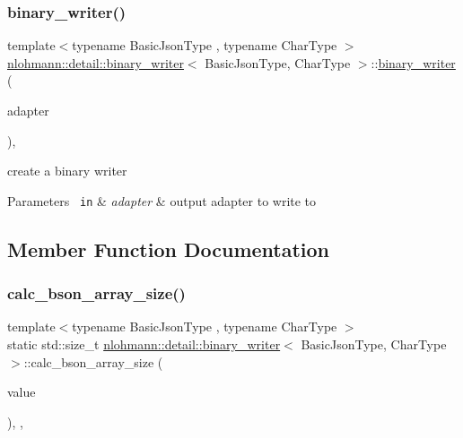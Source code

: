 \subsubsection{\texorpdfstring{binary\_writer()}{binary\_writer()}}
{\footnotesize\ttfamily template$<$typename Basic\+Json\+Type , typename Char\+Type $>$ \\
\mbox{\hyperlink{classnlohmann_1_1detail_1_1binary__writer}{nlohmann\+::detail\+::binary\+\_\+writer}}$<$ Basic\+Json\+Type, Char\+Type $>$\+::\mbox{\hyperlink{classnlohmann_1_1detail_1_1binary__writer}{binary\+\_\+writer}} (\begin{DoxyParamCaption}\item[{\mbox{\hyperlink{namespacenlohmann_1_1detail_a9b680ddfb58f27eb53a67229447fc556}{output\+\_\+adapter\+\_\+t}}$<$ Char\+Type $>$}]{adapter }\end{DoxyParamCaption})\hspace{0.3cm}{\ttfamily [inline]}, {\ttfamily [explicit]}}



create a binary writer 


\begin{DoxyParams}[1]{Parameters}
\mbox{\texttt{ in}}  & {\em adapter} & output adapter to write to \\
\hline
\end{DoxyParams}


\subsection{Member Function Documentation}
\mbox{\label{classnlohmann_1_1detail_1_1binary__writer_af08f9302a02516ff8cf358a99aaa1ddf}} 
\subsubsection{\texorpdfstring{calc\_bson\_array\_size()}{calc\_bson\_array\_size()}}
{\footnotesize\ttfamily template$<$typename Basic\+Json\+Type , typename Char\+Type $>$ \\
static std\+::size\+\_\+t \mbox{\hyperlink{classnlohmann_1_1detail_1_1binary__writer}{nlohmann\+::detail\+::binary\+\_\+writer}}$<$ Basic\+Json\+Type, Char\+Type $>$\+::calc\+\_\+bson\+\_\+array\+\_\+size (\begin{DoxyParamCaption}\item[{const typename Basic\+Json\+Type\+::array\+\_\+t \&}]{value }\end{DoxyParamCaption})\hspace{0.3cm}{\ttfamily [inline]}, {\ttfamily [static]}, {\ttfamily [private]}}

